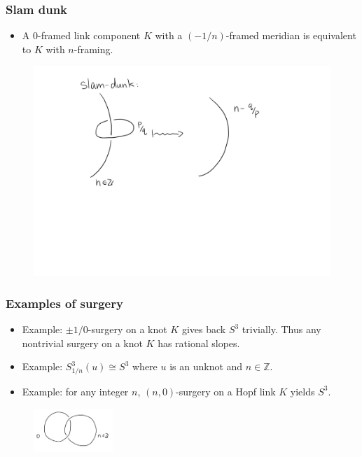 \documentclass{beamer}
\theoremstyle{ex}
\theoremstyle{rem}
\begin{document}
	\begin{frame}
		\frametitle{Slam dunk}
		\begin{itemize}
			\item A $0$-framed link component $K$ with a $(-1/n)$-framed meridian is equivalent to $K$ with $n$-framing.
		\end{itemize}
		\pause
		\begin{figure}
			\includegraphics[width=\textwidth]{slamdunk}
		\end{figure}
	\end{frame}

\begin{frame}
	\frametitle{Examples of surgery}
	\begin{itemize}
		\item Example: $\pm 1/0$-surgery on a knot $K$ gives back $S^3$ trivially. Thus any nontrivial surgery on a knot $K$ has rational slopes.  			
	\end{itemize}
	\begin{itemize}
		\item Example: $S^3_{1/n}(u) \cong S^3$ where $u$ is an unknot and $n \in \mathbb{Z}$.
			\item Example: for any integer $n$, $(n, 0)$-surgery on a Hopf link $K$ yields $S^3$.
	\end{itemize}
\begin{figure}
	\centering
	\includegraphics[width=30mm]{Hopf.jpg}
\end{figure}
		
\end{frame}
\end{document}

